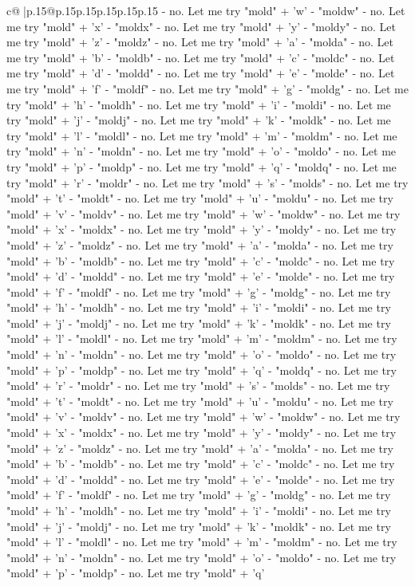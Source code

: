 \documentclass{article}
\begin{document}
{\begin{supertabular}{c@{$\;$}|p{.15\linewidth}@{}p{.15\linewidth}p{.15\linewidth}p{.15\linewidth}p{.15\linewidth}p{.15\linewidth}}
{{{{-} no. Let me try "mold" + 'w' {-} "moldw" {-} no. Let me try "mold" + 'x' {-} "moldx" {-} no. Let me try "mold" + 'y' {-} "moldy" {-} no. Let me try "mold" + 'z' {-} "moldz" {-} no. Let me try "mold" + 'a' {-} "molda" {-} no. Let me try "mold" + 'b' {-} "moldb" {-} no. Let me try "mold" + 'c' {-} "moldc" {-} no. Let me try "mold" + 'd' {-} "moldd" {-} no. Let me try "mold" + 'e' {-} "molde" {-} no. Let me try "mold" + 'f' {-} "moldf" {-} no. Let me try "mold" + 'g' {-} "moldg" {-} no. Let me try "mold" + 'h' {-} "moldh" {-} no. Let me try "mold" + 'i' {-} "moldi" {-} no. Let me try "mold" + 'j' {-} "moldj" {-} no. Let me try "mold" + 'k' {-} "moldk" {-} no. Let me try "mold" + 'l' {-} "moldl" {-} no. Let me try "mold" + 'm' {-} "moldm" {-} no. Let me try "mold" + 'n' {-} "moldn" {-} no. Let me try "mold" + 'o' {-} "moldo" {-} no. Let me try "mold" + 'p' {-} "moldp" {-} no. Let me try "mold" + 'q' {-} "moldq" {-} no. Let me try "mold" + 'r' {-} "moldr" {-} no. Let me try "mold" + 's' {-} "molds" {-} no. Let me try "mold" + 't' {-} "moldt" {-} no. Let me try "mold" + 'u' {-} "moldu" {-} no. Let me try "mold" + 'v' {-} "moldv" {-} no. Let me try "mold" + 'w' {-} "moldw" {-} no. Let me try "mold" + 'x' {-} "moldx" {-} no. Let me try "mold" + 'y' {-} "moldy" {-} no. Let me try "mold" + 'z' {-} "moldz" {-} no. Let me try "mold" + 'a' {-} "molda" {-} no. Let me try "mold" + 'b' {-} "moldb" {-} no. Let me try "mold" + 'c' {-} "moldc" {-} no. Let me try "mold" + 'd' {-} "moldd" {-} no. Let me try "mold" + 'e' {-} "molde" {-} no. Let me try "mold" + 'f' {-} "moldf" {-} no. Let me try "mold" + 'g' {-} "moldg" {-} no. Let me try "mold" + 'h' {-} "moldh" {-} no. Let me try "mold" + 'i' {-} "moldi" {-} no. Let me try "mold" + 'j' {-} "moldj" {-} no. Let me try "mold" + 'k' {-} "moldk" {-} no. Let me try "mold" + 'l' {-} "moldl" {-} no. Let me try "mold" + 'm' {-} "moldm" {-} no. Let me try "mold" + 'n' {-} "moldn" {-} no. Let me try "mold" + 'o' {-} "moldo" {-} no. Let me try "mold" + 'p' {-} "moldp" {-} no. Let me try "mold" + 'q' {-} "moldq" {-} no. Let me try "mold" + 'r' {-} "moldr" {-} no. Let me try "mold" + 's' {-} "molds" {-} no. Let me try "mold" + 't' {-} "moldt" {-} no. Let me try "mold" + 'u' {-} "moldu" {-} no. Let me try "mold" + 'v' {-} "moldv" {-} no. Let me try "mold" + 'w' {-} "moldw" {-} no. Let me try "mold" + 'x' {-} "moldx" {-} no. Let me try "mold" + 'y' {-} "moldy" {-} no. Let me try "mold" + 'z' {-} "moldz" {-} no. Let me try "mold" + 'a' {-} "molda" {-} no. Let me try "mold" + 'b' {-} "moldb" {-} no. Let me try "mold" + 'c' {-} "moldc" {-} no. Let me try "mold" + 'd' {-} "moldd" {-} no. Let me try "mold" + 'e' {-} "molde" {-} no. Let me try "mold" + 'f' {-} "moldf" {-} no. Let me try "mold" + 'g' {-} "moldg" {-} no. Let me try "mold" + 'h' {-} "moldh" {-} no. Let me try "mold" + 'i' {-} "moldi" {-} no. Let me try "mold" + 'j' {-} "moldj" {-} no. Let me try "mold" + 'k' {-} "moldk" {-} no. Let me try "mold" + 'l' {-} "moldl" {-} no. Let me try "mold" + 'm' {-} "moldm" {-} no. Let me try "mold" + 'n' {-} "moldn" {-} no. Let me try "mold" + 'o' {-} "moldo" {-} no. Let me try "mold" + 'p' {-} "moldp" {-} no. Let me try "mold" + 'q' }}}
\end{supertabular}}
\end{document}
